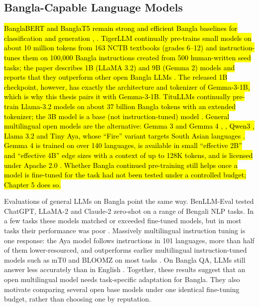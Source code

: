 \subsection{Bangla-Capable Language Models}\label{bangla-capable-language-models}

\hl{BanglaBERT and BanglaT5 remain strong and efficient Bangla baselines
for classification and generation \cite{bhattacharjee2022banglabert}, \cite{bhattacharjee2023banglanlg}. TigerLLM continually
pre-trains small models on about 10 million tokens from 163 NCTB
textbooks (grades 6--12) and instruction-tunes them on 100,000 Bangla
instructions created from 500 human-written seed tasks; the paper
describes 1B (LLaMA 3.2) and 9B (Gemma 2) models and reports that they
outperform other open Bangla LLMs \cite{raihan2025tigerllm}. The released 1B checkpoint,
however, has exactly the architecture and tokenizer of Gemma-3-1B, which
is why this thesis pairs it with Gemma-3-1B. TituLLMs continually
pre-train Llama-3.2 models on about 37 billion Bangla tokens with an
extended tokenizer; the 3B model is a base (not instruction-tuned) model
\cite{titulm2025}. General multilingual open models are the alternative: Gemma 3
and Gemma 4 \cite{gemma4}, \cite{gemma3}, Qwen3 \cite{qwen3}, Llama 3.2 \cite{meta2024llama32} and
Tiny Aya, whose ``Fire'' variant targets South Asian languages \cite{tinyaya}.
Gemma 4 is trained on over 140 languages, is available in small
``effective 2B'' and ``effective 4B'' edge sizes with a context of up to
128K tokens, and is licensed under Apache 2.0 \cite{gemma4}. Whether Bangla
continued pre-training still helps once a model is fine-tuned for the
task had not been tested under a controlled budget; Chapter 5 does so.}

Evaluations of general LLMs on Bangla point the same way. BenLLM-Eval
tested ChatGPT, LLaMA-2 and Claude-2 zero-shot on a range of Bengali NLP
tasks. In a few tasks these models matched or exceeded fine-tuned
models, but in most tasks their performance was poor
\cite{kabir2024benllmeval}. Massively multilingual instruction tuning is
one response: the Aya model follows instructions in 101 languages, more
than half of them lower-resourced, and outperforms earlier multilingual
instruction-tuned models such as mT0 and BLOOMZ on most tasks
\cite{ustun2024aya}. On Bangla QA, LLMs still answer less accurately than
in English \cite{shafayat2024benqa}. Together, these results suggest
that an open multilingual model needs task-specific adaptation for
Bangla. They also motivate comparing several open base models under
one identical fine-tuning budget, rather than choosing one by
reputation.

